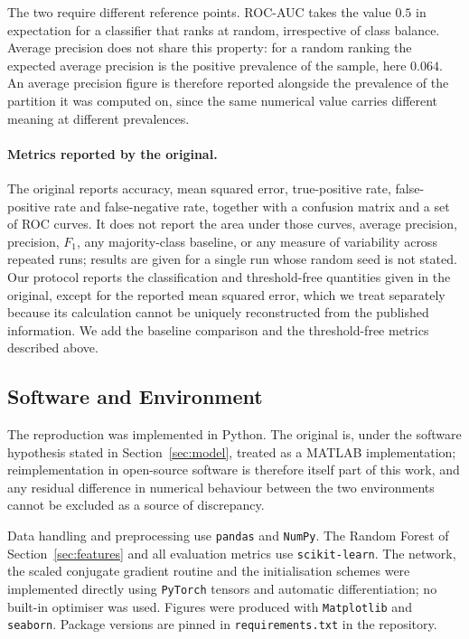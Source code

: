 The two require different reference points. ROC-AUC takes the value $0.5$ in
expectation for a classifier that ranks at random, irrespective of class
balance. Average precision does not share this property: for a random ranking
the expected average precision is the positive prevalence of the sample, here
$0.064$. An average precision figure is therefore reported alongside the
prevalence of the partition it was computed on, since the same numerical value
carries different meaning at different prevalences.

\paragraph{Metrics reported by the original.} The original reports accuracy,
mean squared error, true-positive rate, false-positive rate and false-negative
rate, together with a confusion matrix and a set of ROC curves. It does not
report the area under those curves, average precision, precision, $F_1$, any
majority-class baseline, or any measure of variability across repeated runs;
results are given for a single run whose random seed is not stated. Our
protocol reports the classification and threshold-free quantities given in the
original, except for the reported mean squared error, which we treat separately
because its calculation cannot be uniquely reconstructed from the published
information. We add the baseline comparison and the threshold-free metrics
described above.

\subsection{Software and Environment}\label{sec:software}

The reproduction was implemented in Python. The original is, under the software
hypothesis stated in Section~\ref{sec:model}, treated as a MATLAB
implementation; reimplementation in open-source software is therefore itself
part of this work, and any residual difference in numerical behaviour between
the two environments cannot be excluded as a source of discrepancy.

Data handling and preprocessing use \texttt{pandas} and \texttt{NumPy}. The
Random Forest of Section~\ref{sec:features} and all evaluation metrics use
\texttt{scikit-learn}. The network, the scaled conjugate gradient routine and
the initialisation schemes were implemented directly using \texttt{PyTorch}
tensors and automatic differentiation; no built-in optimiser was used. Figures
were produced with \texttt{Matplotlib} and \texttt{seaborn}. Package versions
are pinned in \texttt{requirements.txt} in the repository.

